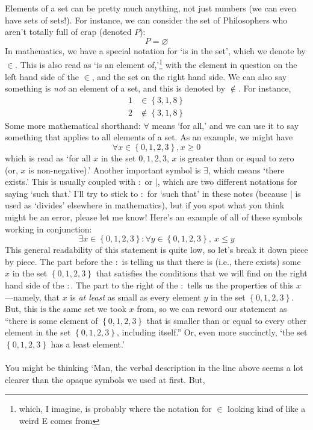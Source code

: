 \documentclass[10pt]{article}
\theoremstyle{definition}
\newcommand{\set}[1]{\left\{ #1 \right\}}
\begin{document}
Elements of a set can be pretty much anything, not just numbers (we
can even have sets of sets!).  For instance, we can consider the set
of Philosophers who aren't totally full of crap (denoted $P$):
\[P = \varnothing\]
In mathematics, we have a special notation for `is in the set', which
we denote by $\in$.  This is also read as `is an element
of,'\footnote{which, I imagine, is probably where the notation for
  $\in$ looking kind of like a weird E comes from} with the element in
question on the left hand side of the $\in$, and the set on the right
hand side.  We can also say something is \emph{not} an element of a
set, and this is denoted by $\notin$.  For instance,
\begin{align*}
1&\in\set{3,1,8}\\
2&\notin\set{3,1,8}
\end{align*}
Some more mathematical shorthand: $\forall$ means `for all,' and we
can use it to say something that applies to all elements of a set.  As
an example, we might have
\[\forall x\in \set{0,1,2,3}, x\geq 0\]
which is read as `for all $x$ in the set ${0,1,2,3}$, $x$ is greater
than or equal to zero (or, $x$ is non-negative).'  Another important
symbol is $\exists$, which means `there exists.'  This is usually
coupled with $:$ or $|$, which are two different notations for saying
`such that.'  I'll try to stick to $:$ for `such that' in these notes
(because $|$ is used as `divides' elsewhere in mathematics), but if
you spot what you think might be an error, please let me know!  Here's
an example of all of these symbols working in conjunction:
\[\exists x\in \set{0,1,2,3} : \forall y\in\set{0,1,2,3},~x\leq y\]
This general readability of this statement is quite low, so let's
break it down piece by piece.  The part before the $:$ is telling us
that there is (i.e., there exists) some $x$ in the set $\set{0,1,2,3}$
that satisfies the conditions that we will find on the right hand side
of the $:$.  The part to the right of the $:$ tells us the properties
of this $x$---namely, that $x$ is \emph{at least} as small as every
element $y$ in the set $\set{0,1,2,3}$.  But, this is the same set we
took $x$ from, so we can reword our statement as ``there is some
element of $\set{0,1,2,3}$ that is smaller than or equal to every
other element in the set $\set{0,1,2,3}$, including itself.''  Or,
even more succinctly, `the set $\set{0,1,2,3}$ has a least element.'
\\~\\
You might be thinking `Man, the verbal description in the line above
seems a lot clearer than the opaque symbols we used at first.  But,
\end{document}

